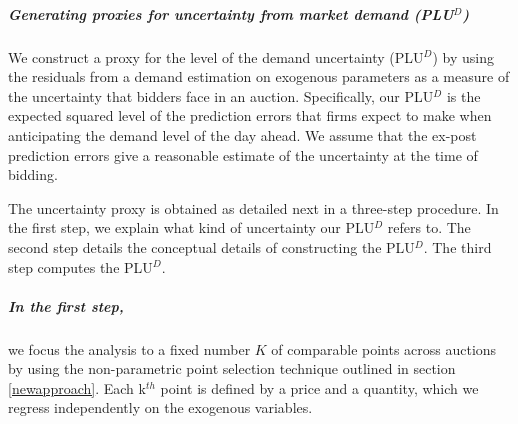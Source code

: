 \subparagraph{Generating proxies for uncertainty from market demand (PLU$^D$)}
\label{proxyunc}

We construct a proxy for the level of the demand uncertainty (PLU$^{D}$) by using the residuals from a demand estimation on exogenous parameters as a measure of the uncertainty that bidders face in an auction. Specifically, our PLU$^D$ is the expected squared level of the prediction errors that firms expect to make when anticipating the demand level of the day ahead. We assume that the ex-post prediction errors give a reasonable estimate of the uncertainty at the time of bidding. 




The uncertainty proxy
is obtained as detailed next in a three-step procedure. In the first step, we explain what kind of uncertainty our PLU$^D$ refers to. The second step details the conceptual details of constructing the PLU$^D$. The third step computes the PLU$^D$. %


\subparagraph{In the first step,} 
\label{firststepresiduals}
we focus the analysis to a fixed number $K$ of comparable points across auctions by using the non-parametric point selection technique outlined in section \ref{newapproach}. 
Each k$^{th}$ point is defined by a price and a quantity, which we regress independently on the exogenous variables. %

